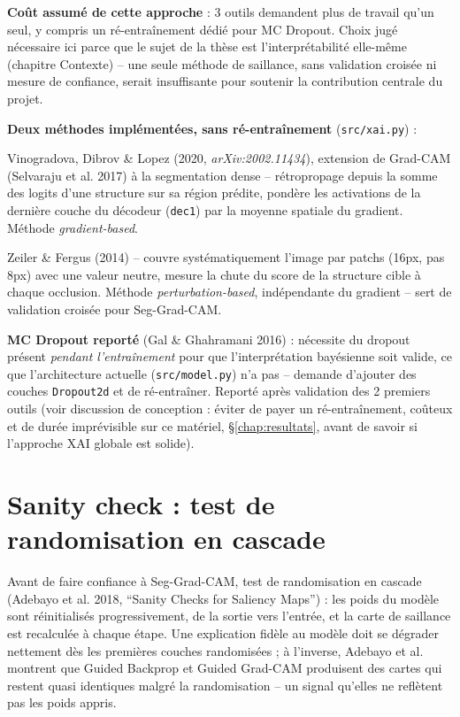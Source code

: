 \documentclass[11pt,a4paper]{report}
\begin{document}
\textbf{Coût assumé de cette approche} : 3 outils demandent plus de travail qu'un
seul, y compris un ré-entraînement dédié pour MC Dropout. Choix jugé nécessaire ici
parce que le sujet de la thèse est l'interprétabilité elle-même (chapitre
Contexte) -- une seule méthode de saillance, sans validation croisée ni mesure de
confiance, serait insuffisante pour soutenir la contribution centrale du projet.

\textbf{Deux méthodes implémentées, sans ré-entraînement} (\texttt{src/xai.py}) :

\begin{description}[style=nextline]
    \item[Seg-Grad-CAM] Vinogradova, Dibrov \& Lopez (2020, \emph{arXiv:2002.11434}),
        extension de Grad-CAM (Selvaraju et al. 2017) à la segmentation dense --
        rétropropage depuis la somme des logits d'une structure sur sa région
        prédite, pondère les activations de la dernière couche du décodeur
        (\texttt{dec1}) par la moyenne spatiale du gradient. Méthode
        \emph{gradient-based}.
    \item[Occlusion] Zeiler \& Fergus (2014) -- couvre systématiquement l'image par
        patchs (16px, pas 8px) avec une valeur neutre, mesure la chute du score de
        la structure cible à chaque occlusion. Méthode \emph{perturbation-based},
        indépendante du gradient -- sert de validation croisée pour Seg-Grad-CAM.
\end{description}

\textbf{MC Dropout reporté} (Gal \& Ghahramani 2016) : nécessite du dropout présent
\emph{pendant l'entraînement} pour que l'interprétation bayésienne soit valide, ce
que l'architecture actuelle (\texttt{src/model.py}) n'a pas -- demande d'ajouter des
couches \texttt{Dropout2d} et de ré-entraîner. Reporté après validation des 2 premiers
outils (voir discussion de conception : éviter de payer un ré-entraînement, coûteux
et de durée imprévisible sur ce matériel, \S\ref{chap:resultats}, avant de savoir si
l'approche XAI globale est solide).

\section{Sanity check : test de randomisation en cascade}
\label{sec:xai-sanity-check}

Avant de faire confiance à Seg-Grad-CAM, test de randomisation en cascade (Adebayo
et al. 2018, ``Sanity Checks for Saliency Maps'') : les poids du modèle sont
réinitialisés progressivement, de la sortie vers l'entrée, et la carte de saillance
est recalculée à chaque étape. Une explication fidèle au modèle doit se dégrader
nettement dès les premières couches randomisées ; à l'inverse, Adebayo et al.
montrent que Guided Backprop et Guided Grad-CAM produisent des cartes qui restent
quasi identiques malgré la randomisation -- un signal qu'elles ne reflètent pas les
poids appris.
\end{document}

